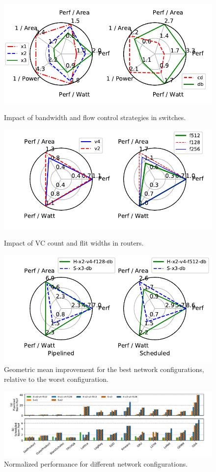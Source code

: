 \begin{figure}
  \centering
\includegraphics[width=0.8\columnwidth]{network/figs/radar_switch.pdf}
  \caption{
    Impact of bandwidth and flow control strategies in switches.}\label{fig:radar_switch}
\includegraphics[width=0.8\columnwidth]{network/figs/radar_router.pdf}
  \caption{Impact of VC count and flit widths in routers.}\label{fig:radar_router}
\includegraphics[width=0.8\columnwidth]{network/figs/radar_best.pdf}
  \caption{Geometric mean improvement for the best network configurations, relative to the worst configuration.}\label{fig:radar_best}
\end{figure}

\begin{figure}
\centering
\includegraphics[width=1\linewidth]{network/figs/perf.pdf}
  \caption{Normalized performance for different network configurations.}\label{fig:perf}
\end{figure}

